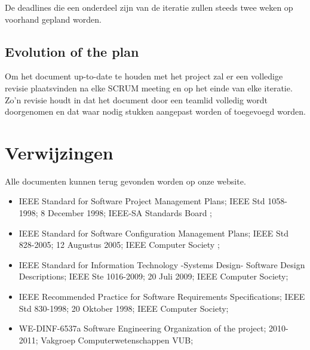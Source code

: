 \documentclass{article}
\begin{document}
De deadlines die een onderdeel zijn van de iteratie zullen steeds twee weken op voorhand gepland worden.

\subsection{Evolution of the plan}

Om het document up-to-date te houden met het project zal er een volledige revisie plaatsvinden na elke SCRUM meeting en op het einde van elke iteratie. Zo'n revisie houdt in dat het document door een teamlid volledig wordt doorgenomen en dat waar nodig stukken aangepast worden of toegevoegd worden.


\newpage

\section{Verwijzingen}



Alle documenten kunnen terug gevonden worden op onze website.

\begin{itemize}
	\item IEEE Standard for Software Project Management Plans; IEEE Std 1058-1998; 8 December 1998; IEEE-SA Standards Board ; \\ 
	\item IEEE Standard for Software Configuration Management Plans; IEEE Std 828-2005; 12 Augustus 2005; IEEE Computer Society ; \\
	\item IEEE Standard for Information Technology -Systems Design- Software Design Descriptions; IEEE Ste 1016-2009; 20 Juli 2009; IEEE Computer Society;  \\
	\item IEEE Recommended Practice for Software Requirements Specifications; IEEE Std 830-1998; 20 Oktober 1998; IEEE Computer Society; \\
	\item WE-DINF-6537a  Software Engineering Organization of the project; 2010-2011; Vakgroep Computerwetenschappen VUB;  \\
\end{itemize}
\end{document}
